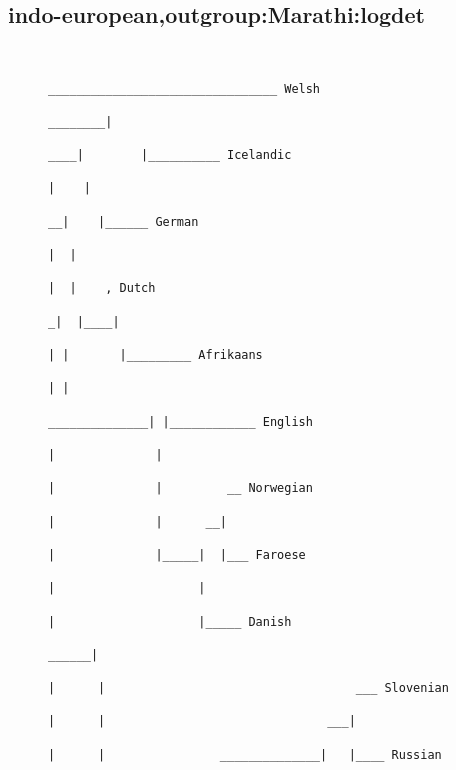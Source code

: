 \subsection{indo-european,outgroup:Marathi:logdet}
\begin{figure}[H]
\begin{center}
{
\selectfont
\begin{verbatim}

                                                                                                        ________________________________ Welsh
                                                                                               ________|
                                                                                          ____|        |__________ Icelandic
                                                                                         |    |
                                                                                       __|    |______ German
                                                                                      |  |
                                                                                      |  |    , Dutch
                                                                                     _|  |____|
                                                                                    | |       |_________ Afrikaans
                                                                                    | |
                                                                      ______________| |____________ English
                                                                     |              |
                                                                     |              |         __ Norwegian
                                                                     |              |      __|
                                                                     |              |_____|  |___ Faroese
                                                                     |                    |
                                                                     |                    |_____ Danish
                                                               ______|
                                                              |      |                                   ___ Slovenian
                                                              |      |                               ___|
                                                              |      |                ______________|   |____ Russian

\end{verbatim}}
\end{center}
\end{figure}
